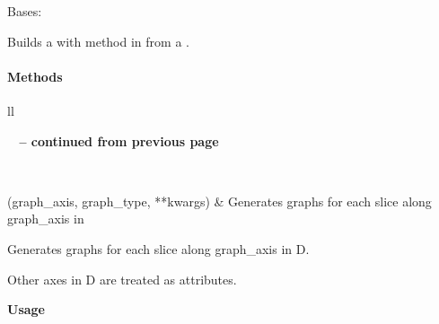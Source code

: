 \documentclass[letterpaper,10pt,english]{sphinxmanual}
\begin{document}
\begin{fulllineitems}
\label{tethne:tethne.builders.paperCollectionBuilder}
Bases: {\hyperref[tethne:tethne.builders.builder]{}}

Builds a {\hyperref[tethne:tethne.data.GraphCollection]{}} with method in 
{\hyperref[tethne.networks:module-tethne.networks.papers]{}} from a {\hyperref[tethne:tethne.data.DataCollection]{}} .
\paragraph{Methods}

\begin{longtable}{ll}
\hline
\endfirsthead

%
{{\bfseries \tablename\ \thetable{} -- continued from previous page}} \\
\hline
\endhead

\hline {} \\ \hline
\endfoot

\hline
\endlastfoot


{\hyperref[tethne:tethne.builders.paperCollectionBuilder.build]{}}(graph\_axis, graph\_type, **kwargs)
 & 
Generates graphs for each slice along graph\_axis in
\\\hline
\end{longtable}


\begin{fulllineitems}
\label{tethne:tethne.builders.paperCollectionBuilder.build}
Generates graphs for each slice along graph\_axis in
{\hyperref[tethne:tethne.data.DataCollection]{}} D.

Other axes in D are treated as attributes.

\textbf{Usage}


\end{fulllineitems}
\end{fulllineitems}
\end{document}
